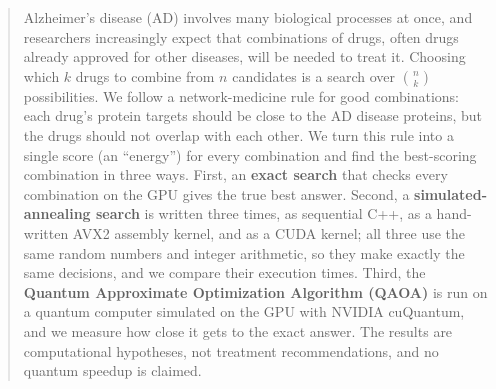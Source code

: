 \begin{abstract}
Alzheimer's disease (AD) involves many biological processes at once, and researchers increasingly expect that combinations of drugs, often drugs already approved for other diseases, will be needed to treat it. Choosing which $k$ drugs to combine from $n$ candidates is a search over $\binom{n}{k}$ possibilities. We follow a network-medicine rule for good combinations: each drug's protein targets should be close to the AD disease proteins, but the drugs should not overlap with each other. We turn this rule into a single score (an ``energy'') for every combination and find the best-scoring combination in three ways. First, an \textbf{exact search} that checks every combination on the GPU gives the true best answer. Second, a \textbf{simulated-annealing search} is written three times, as sequential C++, as a hand-written AVX2 assembly kernel, and as a CUDA kernel; all three use the same random numbers and integer arithmetic, so they make exactly the same decisions, and we compare their execution times. Third, the \textbf{Quantum Approximate Optimization Algorithm (QAOA)} is run on a quantum computer simulated on the GPU with NVIDIA cuQuantum, and we measure how close it gets to the exact answer. The results are computational hypotheses, not treatment recommendations, and no quantum speedup is claimed.
\end{abstract}
